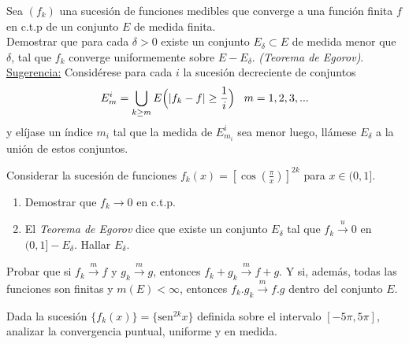 \documentclass{book}
\begin{document}
\begin{ejer}{} 
Sea $(f_k)$ una sucesión de  funciones medibles que converge a una función finita $f$
en c.t.p de un conjunto $E$ de medida finita. 
\\
Demostrar que para cada $\delta>0$  existe un conjunto
$E_{\delta}\subset E$ de medida menor que $\delta$, tal que $f_k$ converge uniformemente sobre 
$E-E_{\delta}$. 
{\it{(Teorema de Egorov)}}.
\\
\underline{Sugerencia:} Considérese para cada $i$ la 
sucesión decreciente de conjuntos
$$E_m^i=\bigcup_{k\geq m}E\Bigl(|f_k-f|\geq \frac{1}{i}\Bigr) \;\;\;m=1,2,3,...$$
y elíjase un índice $m_i$ tal que la medida de $E_{m_i}^i$ sea menor luego, llámese $E_{\delta}$ a la unión de estos conjuntos.
\end{ejer} 

\begin{ejer}{} 
Considerar la sucesi\'on de funciones $f_k(x)=\left[\cos(\frac{\pi}{x})\right]^{2k}$ para $x \in (0,1]$.
\begin{enumerate}
\item Demostrar que $f_k \to 0$ en c.t.p.
\item El \textit{Teorema de Egorov} dice que existe un conjunto $E_{\delta}$ tal que $f_k \xrightarrow{u} 0$
en $(0,1]-E_{\delta}$. 
Hallar $E_{\delta}$.
\end{enumerate}
\end{ejer}


\begin{ejer}{} Probar que si $f_k \stackrel{m}{\rightarrow}f$ \;y\; $g_k \stackrel{m}{\rightarrow}g$, entonces \;
$f_k+g_k \stackrel{m}{\rightarrow}f+g$.  
Y si, además, todas las funciones son finitas y $m(E)<\infty$, entonces $f_k.g_k \stackrel{m} \rightarrow f.g$
dentro del conjunto $E$.
\end{ejer}

\begin{ejer}{} 
Dada la sucesión $\{f_k(x)\}=\{\text{sen}^{2k} x\}$ definida sobre el intervalo $[-5 \pi, 5\pi]$, 
analizar  la convergencia puntual, uniforme y en medida.
\end{ejer}


\end{document}

